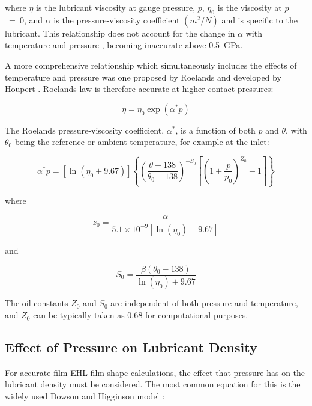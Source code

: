 where $\eta$ is the lubricant viscosity at gauge pressure, $p$, $\eta_0$ is the viscosity at $p$~=~0, and $\alpha$ is the pressure-viscosity coefficient $({m}^2 /{N})$ and is specific to the lubricant. This relationship does not account for the change in $\alpha$ with temperature and pressure \cite{Gohar2019}, becoming inaccurate above 0.5~GPa.

A more comprehensive relationship which simultaneously includes the effects of temperature and pressure was one proposed by Roelands \cite{Roelands1966} and developed by Houpert \cite{Houpert1984}.  Roelands law is therefore accurate at higher contact pressures:

\begin{equation}\label{eq3.25}
    \eta=\eta_0 \exp \left(\alpha^* p\right)
\end{equation}

The Roelands pressure-viscosity coefficient, $\alpha^\ast$, is a function of both $p$ and $\theta$, with $\theta_0$ being the reference or ambient temperature, for example at the inlet:

\begin{equation}\label{eq3.26}
	\alpha^* p=\left[\ln \left(\eta_0+9.67\right)\right]\left\{\left(\frac{\theta-138}{\theta_0-138}\right)^{-S_0}\left[\left(1+\frac{p}{p_0}\right)^{Z_0}-1\right]\right\}
\end{equation}

where

\begin{equation}\label{eq3.27}
	z_0=\frac{\alpha}{5.1 \times 10^{-9}\left[\ln \left(\eta_0\right)+9.67\right]}
\end{equation}

and

\begin{equation}\label{eq3.28}
	S_0=\frac{\beta\left(\theta_0-138\right)}{\ln \left(\eta_0\right)+9.67}
\end{equation}

The oil constants $Z_0$ and $S_0$ are independent of both pressure and temperature, and $Z_0$ can be typically taken as 0.68 for computational purposes.

\subsection{Effect of Pressure on Lubricant Density}

For accurate film EHL film shape calculations, the effect that pressure has on the lubricant density must be considered. The most common equation for this is the widely used Dowson and Higginson model \cite{Dowson1977}:

